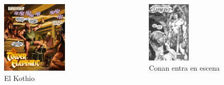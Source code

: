 \begin{frame}{}
\begin{columns}
    \begin{figure}[htb]
    \centering
        \includegraphics[width=0.65\textwidth]{img/res/03}
        \caption{El Kothio}
    \end{figure}    
    \begin{figure}[htb]
    \centering
        \includegraphics[width=0.55\textwidth]{img/res/04}
        \caption{Conan entra en escena}
    \end{figure}    
\end{columns}
\end{frame}

